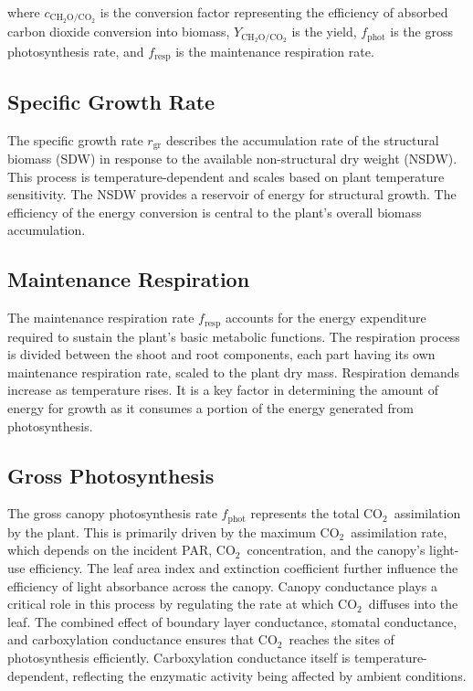 \documentclass[conference]{IEEEtran}
\newcommand{\ui}[2]{#1_{\mathrm{#2}}}
\newcommand{\coo}{\ensuremath{\mathrm{CO_2}}}
\newcommand{\chho}{\ensuremath{\mathrm{CH_2O}}}
\begin{document}
where \( c_{\chho/\coo} \) is the conversion factor representing the efficiency of absorbed carbon dioxide conversion into biomass, \( Y_{\chho/\coo} \) is the yield, \( \ui{f}{phot} \) is the gross photosynthesis rate, and \( \ui{f}{resp} \) is the maintenance respiration rate.

\subsection{Specific Growth Rate} The specific growth rate \( \ui{r}{gr} \) describes the accumulation rate of the structural biomass (SDW) in response to the available non-structural dry weight (NSDW). This process is temperature-dependent and scales based on plant temperature sensitivity. The NSDW provides a reservoir of energy for structural growth. The efficiency of the energy conversion is central to the plant's overall biomass accumulation.

\subsection{Maintenance Respiration} The maintenance respiration rate \( \ui{f}{resp} \) accounts for the energy expenditure required to sustain the plant's basic metabolic functions. The respiration process is divided between the shoot and root components, each part having its own maintenance respiration rate, scaled to the plant dry mass. Respiration demands increase as temperature rises. It is a key factor in determining the amount of energy for growth as it consumes a portion of the energy generated from photosynthesis.

\subsection{Gross Photosynthesis} The gross canopy photosynthesis rate \( \ui{f}{phot} \) represents the total \coo\ assimilation by the plant. This is primarily driven by the maximum \coo\ assimilation rate, which depends on the incident PAR, \coo\ concentration, and the canopy's light-use efficiency. The leaf area index and extinction coefficient further influence the efficiency of light absorbance across the canopy. Canopy conductance plays a critical role in this process by regulating the rate at which \coo\ diffuses into the leaf. The combined effect of boundary layer conductance, stomatal conductance, and carboxylation conductance ensures that \coo\ reaches the sites of photosynthesis efficiently. Carboxylation conductance itself is temperature-dependent, reflecting the enzymatic activity being affected by ambient conditions.
\end{document}
